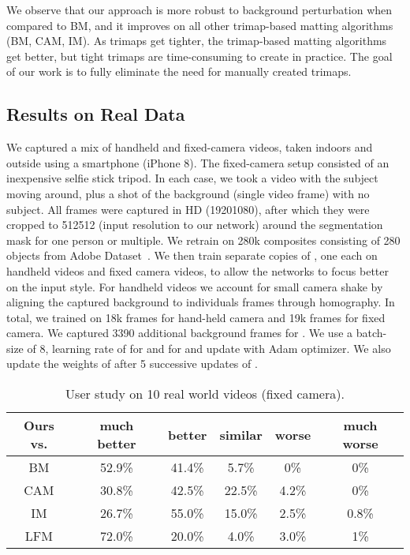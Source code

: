 \documentclass[10pt,twocolumn,letterpaper]{article}
\begin{document}
We observe that our approach is more robust to background perturbation when compared to BM, and it improves on all other trimap-based matting algorithms (BM, CAM, IM). As trimaps get tighter, the trimap-based matting algorithms get better, but tight trimaps are time-consuming to create in practice. The goal of our work is to fully eliminate the need for manually created trimaps. 









\subsection{Results on Real Data}
\label{sec:real}



We captured a mix of handheld and fixed-camera videos, taken indoors and outside using a smartphone (iPhone 8).  The fixed-camera setup consisted of an inexpensive selfie stick tripod. In each case, we took a video with the subject moving around, plus a shot of the background (single video frame) with no subject.  All frames were captured in HD (19201080), after which they were cropped to 512512 (input resolution to our network) around the segmentation mask for one person or multiple. We retrain  on 280k composites consisting of 280 objects from Adobe Dataset~\cite{xu2017deep}. We then train separate copies of , one each on handheld videos and fixed camera videos, to allow the networks to focus better on the input style. For handheld videos we account for small camera shake by  aligning the captured background to individuals frames through homography.  In total, we trained on 18k frames for hand-held camera and 19k frames for fixed camera. We captured 3390 additional background frames for . We use a batch-size of 8, learning rate of  for  and  for  and update  with Adam optimizer. We also update the weights of  after 5 successive updates of .

\begin{table}[!h]
\vspace{-0.5em}
\setlength\tabcolsep{2pt}
	\centering
\small
	\captionsetup{justification=centering}
    	\vspace{-.5em}
		\begin{tabular}{c|ccccc}
			\toprule
			 Ours vs. &  much better & better & similar & worse & much worse \\ 
			 \midrule
			 BM & 52.9\% & 41.4\% & 5.7\% & 0\% & 0\%\\
			 CAM & 30.8\% & 42.5\% & 22.5\% & 4.2\% & 0\%\\
			 IM & 26.7\% & 55.0\% & 15.0\% & 2.5\% & 0.8\%\\
			 LFM & 72.0\% & 20.0\% & 4.0\% & 3.0\% & 1\%\\
			\bottomrule
		\end{tabular}
		\vspace{-.5em}
		\caption{\small User study on 10 real world videos (fixed camera).}
	\vspace{-1.5em}
	\label{tab:real-fixed}
\end{table}
\end{document}
